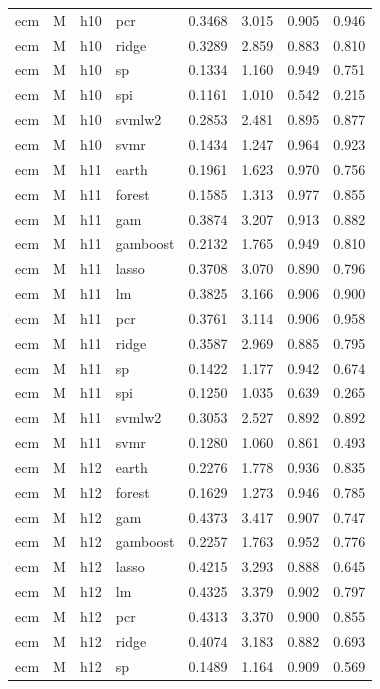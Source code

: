 \begin{ThreePartTable}
\begin{longtable}[t]{llclcccc}
ecm & M & h10 & pcr & 0.3468 & 3.015 & 0.905 & 0.946\\
ecm & M & h10 & ridge & 0.3289 & 2.859 & 0.883 & 0.810\\
ecm & M & h10 & sp & 0.1334 & 1.160 & 0.949 & 0.751\\
ecm & M & h10 & spi & 0.1161 & 1.010 & 0.542 & 0.215\\
ecm & M & h10 & svmlw2 & 0.2853 & 2.481 & 0.895 & 0.877\\
ecm & M & h10 & svmr & 0.1434 & 1.247 & 0.964 & 0.923\\
\addlinespace
ecm & M & h11 & earth & 0.1961 & 1.623 & 0.970 & 0.756\\
ecm & M & h11 & forest & 0.1585 & 1.313 & 0.977 & 0.855\\
ecm & M & h11 & gam & 0.3874 & 3.207 & 0.913 & 0.882\\
ecm & M & h11 & gamboost & 0.2132 & 1.765 & 0.949 & 0.810\\
ecm & M & h11 & lasso & 0.3708 & 3.070 & 0.890 & 0.796\\
ecm & M & h11 & lm & 0.3825 & 3.166 & 0.906 & 0.900\\
ecm & M & h11 & pcr & 0.3761 & 3.114 & 0.906 & 0.958\\
ecm & M & h11 & ridge & 0.3587 & 2.969 & 0.885 & 0.795\\
ecm & M & h11 & sp & 0.1422 & 1.177 & 0.942 & 0.674\\
ecm & M & h11 & spi & 0.1250 & 1.035 & 0.639 & 0.265\\
ecm & M & h11 & svmlw2 & 0.3053 & 2.527 & 0.892 & 0.892\\
ecm & M & h11 & svmr & 0.1280 & 1.060 & 0.861 & 0.493\\
\addlinespace
ecm & M & h12 & earth & 0.2276 & 1.778 & 0.936 & 0.835\\
ecm & M & h12 & forest & 0.1629 & 1.273 & 0.946 & 0.785\\
ecm & M & h12 & gam & 0.4373 & 3.417 & 0.907 & 0.747\\
ecm & M & h12 & gamboost & 0.2257 & 1.763 & 0.952 & 0.776\\
ecm & M & h12 & lasso & 0.4215 & 3.293 & 0.888 & 0.645\\
ecm & M & h12 & lm & 0.4325 & 3.379 & 0.902 & 0.797\\
ecm & M & h12 & pcr & 0.4313 & 3.370 & 0.900 & 0.855\\
ecm & M & h12 & ridge & 0.4074 & 3.183 & 0.882 & 0.693\\
ecm & M & h12 & sp & 0.1489 & 1.164 & 0.909 & 0.569\\

\end{longtable}
\end{ThreePartTable}

